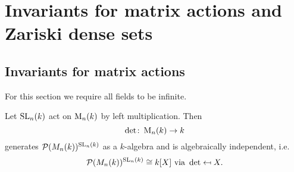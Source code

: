 \chapter{Invariants for matrix actions and Zariski dense sets}





\section{Invariants for matrix actions}
For this section we require all fields to be infinite.


\begin{thrm}
 Let $\operatorname{SL}_n(k)$ act on $\operatorname{M}_n(k)$ by left multiplication. Then
 \[
  \det \colon \operatorname{M}_n(k) \to k
 \]
 generates $\mathcal{P}(M_n(k))^{\operatorname{SL}_n(k)}$ as a $k$-algebra and is algebraically independent, i.e.
 \[
  \mathcal{P}(M_n(k))^{\operatorname{SL}_n(k)} \cong k[X] \text{ via } \det \mapsfrom X.
 \]
\end{thrm}
